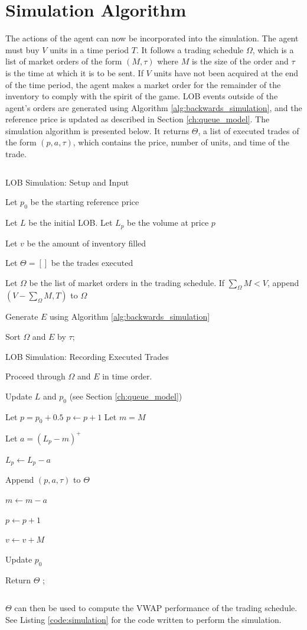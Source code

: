 \section{Simulation Algorithm} \label{ch:simulation_algorithm}

The actions of the agent can now be incorporated into the simulation. The agent must buy $V$ units in a time period $T$. It follows a trading schedule $\Omega$, which is a list of market orders of the form $(M,\tau)$ where $M$ is the size of the order and $\tau$ is the time at which it is to be sent. If $V$ units have not been acquired at the end of the time period, the agent makes a market order for the remainder of the inventory to comply with the spirit of the game. LOB events outside of the agent's orders are generated using Algorithm \ref{alg:backwards_simulation}, and the reference price is updated as described in Section \ref{ch:queue_model}. The simulation algorithm is presented below. It returns $\Theta$, a list of executed trades of the form $(p,a,\tau)$, which contains the price, number of units, and time of the trade.

$$ $$

\begin{algorithm}[H]
\SetAlgoLined
\caption{LOB Simulation: Setup and Input}
Let $p_0$ be the starting reference price \;

Let $L$ be the initial LOB. Let $L_p$ be the volume at price $p$ \;

Let $v$ be the amount of inventory filled \;

Let $\Theta = []$ be the trades executed \;

Let $\Omega$ be the list of market orders in the trading schedule. If $\sum_\Omega{M} < V$, append $(V - \sum_\Omega{M}, T)$ to $\Omega$ \;

Generate $E$ using Algorithm \ref{alg:backwards_simulation} \;

Sort $\Omega$ and $E$ by $\tau$;
\end{algorithm}

\begin{algorithm}[H]
\SetAlgoLined
\caption{LOB Simulation: Recording Executed Trades}
Proceed through $\Omega$ and $E$ in time order. 

 {
     {
        Update $L$ and $p_0$ (see Section \ref{ch:queue_model}) \;
    }
     {
        Let $p = p_0 + 0.5$ \;
         {
            $p \leftarrow p + 1$
        }
        Let $m = M$ \;
         {
            Let $a = (L_p - m)^+$ \;
            
            $L_p \leftarrow L_p - a$ \;
            
            Append $(p, a, \tau)$ to $\Theta$ \;

            $m \leftarrow m - a$ \;
    
            $p \leftarrow p + 1$ \;
        }
        $v \leftarrow v + M$ \;
        
        Update $p_0$ \;
    }
}

Return $\Theta$ ;
\end{algorithm}

$$ $$

$\Theta$ can then be used to compute the VWAP performance of the trading schedule. See Listing \ref{code:simulation} for the code written to perform the simulation.